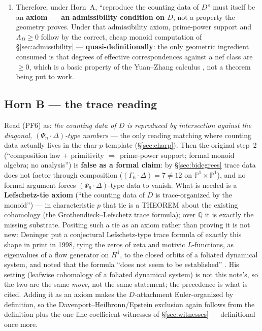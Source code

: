 \documentclass[11pt]{article}
\theoremstyle{plain}
\theoremstyle{definition}
\theoremstyle{remark}
\begin{document}
\begin{enumerate}
excludes it --- its transpose-stability clause fails, $\Gamma_n^t$ having
bidegree $(n, 1)$, not any $\Gamma_m$ --- so the exhibit certifies vacuity of
the (PF1)--(PF4) fragment; see the PF5 status paragraph, \S\ref{sec:axioms}.
Whether some sharpened transpose axiom would cut down the model class further is
not adjudicated and not claimed.)
\item Therefore, under Horn~A, ``reproduce the counting data of $D$'' must
itself be an \textbf{axiom --- an admissibility condition on $D$}, not a
property the geometry proves. Under that admissibility axiom, prime-power
support and $\Lambda_D \ge 0$ follow by the correct, cheap monoid computation of
\S\ref{sec:admissibility} --- \textbf{quasi-definitionally}: the only geometric
ingredient consumed is that degrees of effective correspondences against a nef
class are $\ge 0$, which is a basic property of the Yuan--Zhang calculus
\cite{YZ}, not a theorem being put to work.
\end{enumerate}

\subsection{Horn B --- the trace reading}\label{sec:hornB}

Read (PF6) as: \emph{the counting data of $D$ is reproduced by intersection
against the diagonal, $(\Psi_n \cdot \Delta)$-type numbers} --- the only
reading matching where counting data actually lives in the char-$p$ template
(\S\ref{sec:charp}). Then the original step~2 (``composition law $+$
primitivity $\Longrightarrow$ prime-power support; formal monoid algebra; no
analysis'') is \textbf{false as a formal claim}: by \S\ref{sec:bidegrees} trace
data does not factor through composition ($(\Gamma_6 \cdot \Delta) = 7 \ne 12$
on $\mathbb{P}^1 \times \mathbb{P}^1$), and no formal argument forces
$(\Psi_6 \cdot \Delta)$-type data to vanish. What is needed is a
\textbf{Lefschetz-tie axiom} (``the counting data of $D$ is trace-organized by
the monoid'') --- in characteristic $p$ that tie is a THEOREM about the
existing cohomology (the Grothendieck--Lefschetz trace formula); over $\mathbb{Q}$
it is exactly the missing substrate. Positing such a tie as an axiom rather than
proving it is not new: Deninger \cite{Den98} put a conjectural Lefschetz-type trace
formula of exactly this shape in print in 1998, tying the zeros of zeta and motivic
$L$-functions, as eigenvalues of a flow generator on $H^1$, to the closed orbits of
a foliated dynamical system, and noted that the formula ``does not seem to be
established'' \cite[\S4]{Den98}. His setting (leafwise cohomology of a foliated
dynamical system) is not this note's, so the two are the same \emph{move}, not the
same statement; the precedence is what is cited.
Adding it as an axiom makes the $D$-attachment Euler-organized by definition,
so the Davenport--Heilbronn/Epstein exclusion again follows from the definition
plus the one-line coefficient witnesses of \S\ref{sec:witnesses} ---
definitional once more.
\end{document}
